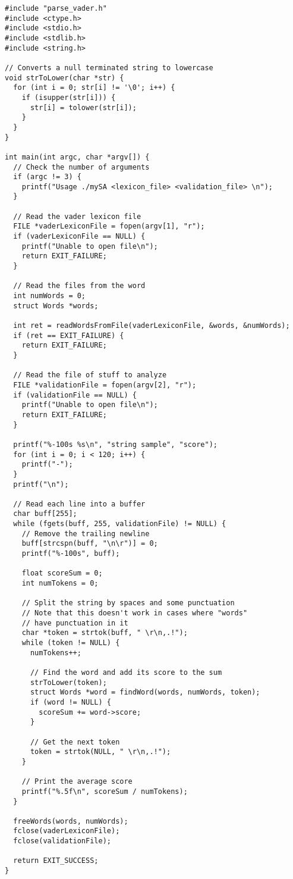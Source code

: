 \documentclass{article}
\theoremstyle{mytheoremstyle}
\theoremstyle{mytheoremstyle}
\theoremstyle{myproblemstyle}
\begin{document}
    \begin{lstlisting}
#include "parse_vader.h"
#include <ctype.h>
#include <stdio.h>
#include <stdlib.h>
#include <string.h>

// Converts a null terminated string to lowercase
void strToLower(char *str) {
  for (int i = 0; str[i] != '\0'; i++) {
    if (isupper(str[i])) {
      str[i] = tolower(str[i]);
    }
  }
}

int main(int argc, char *argv[]) {
  // Check the number of arguments
  if (argc != 3) {
    printf("Usage ./mySA <lexicon_file> <validation_file> \n");
  }

  // Read the vader lexicon file
  FILE *vaderLexiconFile = fopen(argv[1], "r");
  if (vaderLexiconFile == NULL) {
    printf("Unable to open file\n");
    return EXIT_FAILURE;
  }

  // Read the files from the word
  int numWords = 0;
  struct Words *words;

  int ret = readWordsFromFile(vaderLexiconFile, &words, &numWords);
  if (ret == EXIT_FAILURE) {
    return EXIT_FAILURE;
  }

  // Read the file of stuff to analyze
  FILE *validationFile = fopen(argv[2], "r");
  if (validationFile == NULL) {
    printf("Unable to open file\n");
    return EXIT_FAILURE;
  }

  printf("%-100s %s\n", "string sample", "score");
  for (int i = 0; i < 120; i++) {
    printf("-");
  }
  printf("\n");

  // Read each line into a buffer
  char buff[255];
  while (fgets(buff, 255, validationFile) != NULL) {
    // Remove the trailing newline
    buff[strcspn(buff, "\n\r")] = 0;
    printf("%-100s", buff);

    float scoreSum = 0;
    int numTokens = 0;

    // Split the string by spaces and some punctuation
    // Note that this doesn't work in cases where "words"
    // have punctuation in it
    char *token = strtok(buff, " \r\n,.!");
    while (token != NULL) {
      numTokens++;

      // Find the word and add its score to the sum
      strToLower(token);
      struct Words *word = findWord(words, numWords, token);
      if (word != NULL) {
        scoreSum += word->score;
      }

      // Get the next token
      token = strtok(NULL, " \r\n,.!");
    }

    // Print the average score
    printf("%.5f\n", scoreSum / numTokens);
  }

  freeWords(words, numWords);
  fclose(vaderLexiconFile);
  fclose(validationFile);

  return EXIT_SUCCESS;
}
    \end{lstlisting}
\end{document}
